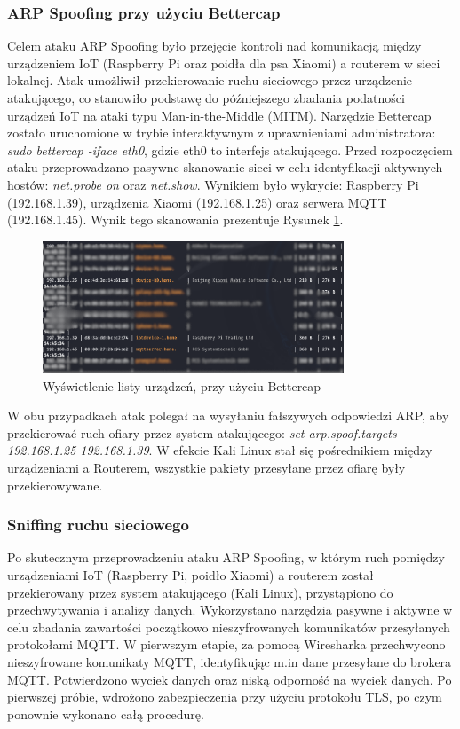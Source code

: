\subsubsection{ARP Spoofing przy użyciu Bettercap}
Celem ataku ARP Spoofing było przejęcie kontroli nad komunikacją między urządzeniem IoT (Raspberry Pi oraz poidła dla psa Xiaomi) a routerem w sieci lokalnej. Atak umożliwił przekierowanie ruchu sieciowego przez urządzenie atakującego, co stanowiło podstawę do późniejszego zbadania podatności urządzeń IoT na ataki typu Man-in-the-Middle (MITM).
Narzędzie Bettercap zostało uruchomione w trybie interaktywnym z uprawnieniami administratora: \textit{sudo bettercap -iface eth0}, gdzie eth0 to interfejs atakującego. Przed rozpoczęciem ataku przeprowadzano pasywne skanowanie sieci w celu identyfikacji aktywnych hostów: \textit{net.probe on} oraz \textit{net.show}. Wynikiem było wykrycie: Raspberry Pi (192.168.1.39), urządzenia Xiaomi (192.168.1.25) oraz serwera MQTT (192.168.1.45). Wynik tego skanowania prezentuje Rysunek \ref{fig:Wyświetlenie listy urządzeń, przy użyciu Bettercap}.
\begin{figure}[h]
    \centering
    \includegraphics[width=0.8\textwidth]{pictures/net-show.png}
    \caption{Wyświetlenie listy urządzeń, przy użyciu Bettercap}
    \label{fig:Wyświetlenie listy urządzeń, przy użyciu Bettercap}
\end{figure}

W obu przypadkach atak polegał na wysyłaniu fałszywych odpowiedzi ARP, aby przekierować ruch ofiary przez system atakującego: \textit{set arp.spoof.targets 192.168.1.25 192.168.1.39}. W efekcie Kali Linux stał się pośrednikiem między urządzeniami a Routerem, wszystkie pakiety przesyłane przez ofiarę były przekierowywane.

\subsubsection{Sniffing ruchu sieciowego}
Po skutecznym przeprowadzeniu ataku ARP Spoofing, w którym ruch pomiędzy urządzeniami IoT (Raspberry Pi, poidło Xiaomi) a routerem został przekierowany przez system atakującego (Kali Linux), przystąpiono do przechwytywania i analizy danych. Wykorzystano narzędzia pasywne i aktywne w celu zbadania zawartości początkowo nieszyfrowanych komunikatów przesyłanych protokołami MQTT. 
W pierwszym etapie, za pomocą Wiresharka przechwycono nieszyfrowane komunikaty MQTT, identyfikując m.in dane przesyłane do brokera MQTT. Potwierdzono wyciek danych oraz niską odporność na wyciek danych.
Po pierwszej próbie, wdrożono zabezpieczenia przy użyciu protokołu TLS, po czym ponownie wykonano całą procedurę.


